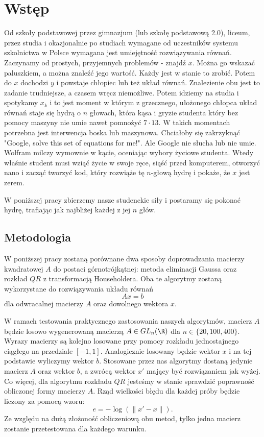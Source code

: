 \section{Wstęp}

Od szkoły podstawowej przez gimnazjum (lub szkołę podstawową 2.0), liceum, przez studia i okazjonalnie po studiach wymagane od uczestników systemu szkolnictwa w Polsce wymagana jest umiejętność rozwiązywania równań. Zaczynamy od prostych, przyjemnych problemów - znajdź $x$. Można go wskazać paluszkiem, a można znaleźć jego wartość. Każdy jest w stanie to zrobić. Potem do $x$ dochodzi $y$ i powstaje chłopiec lub też układ równań. Znalezienie obu jest to zadanie trudniejsze, a czasem wręcz niemożliwe. Potem idziemy na studia i spotykamy $x_k$ i to jest moment w którym z grzecznego, ułożonego chłopca układ równań staje się hydrą o $n$ głowach, która kąsa i gryzie studenta który bez pomocy maszyny nie umie nawet pomnożyć $7\cdot13$. W takich momentach potrzebna jest interwencja boska lub maszynowa. Chciałoby się zakrzyknąć "Google, solve this set of equations for me!". Ale Google nie słucha lub nie umie. Wolfram milczy wymownie w kącie, oceniając wybory życiowe studenta. Wtedy właśnie student musi wziąć życie w swoje ręce, siąść przed komputerem, otworzyć nano i zacząć tworzyć kod, który rozwiąże tę $n$-głową hydrę i pokaże, że $x$ jest zerem.

W poniższej pracy zbierzemy nasze studenckie siły i postaramy się pokonać hydrę, trafiając jak najbliżej każdej z jej $n$ głów.

\subsection{Metodologia}

W poniższej pracy zostaną porównane dwa sposoby doprowadzania macierzy kwadratowej $A$ do postaci górnotrójkątnej: metoda eliminacji Gaussa oraz rozkład $QR$ z transformacją Householdera. Oba te algorytmy zostaną wykorzystane do rozwiązywania układu równań 
$$Ax=b$$
dla odwracalnej macierzy $A$ oraz dowolnego wektora $x$.

W ramach testowania praktycznego zastosowania naszych algorytmów, macierz $A$ będzie losowo wygenerowaną macierzą $A\in GL_n(\R)$ dla $n\in\{20,100,400\}$. Wyrazy macierzy są kolejno losowane przy pomocy rozkładu jednostajnego ciągłego na przedziale $[-1, 1]$. Analogicznie losowany będzie wektor $x$ i na tej podstawie wyliczymy wektor $b$. Stosowane przez nas algorytmy dostaną jedynie macierz $A$ oraz wektor $b$, a zwrócą wektor $x'$ mający być rozwiązaniem jak wyżej. Co więcej, dla algorytmu rozkładu $QR$ jesteśmy w stanie sprawdzić poprawność obliczonej formy macierzy $A$. Rząd wielkości błędu dla każdej próby będzie liczony za pomocą wzoru:
$$e=-\log(\|x'-x\|).$$
Ze względu na dużą złożoność obliczeniową obu metod, tylko jedna macierz zostanie przetestowana dla każdego warunku.

